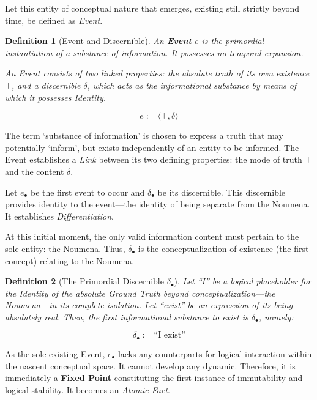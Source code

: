 \documentclass[11pt, a4paper]{article}
\theoremstyle{formalism}
\newtheorem{formalism}{Definition}
\begin{document}
Let this entity of conceptual nature that emerges, existing still strictly
beyond time, be defined as \textit{Event}.

\begin{formalism}[Event and Discernible]

    An \textbf{Event} $e$ is the primordial instantiation of a substance of
    information. It possesses no temporal expansion. 

    An Event consists of two linked properties: the absolute truth of its own
    existence $\top$, and a \textit{discernible} $\delta$, which acts as the
    informational substance by means of which it possesses \textit{Identity}.

    \begin{equation}
        e := \langle \top, \delta \rangle
    \end{equation}

\end{formalism}

The term `substance of information' is chosen to express a truth that may
potentially `inform', but exists independently of an entity to be informed.
The Event establishes a \textit{Link} between its two defining properties:
the mode of truth $\top$ and the content $\delta$.

Let $e_\bullet$ be the first event to occur and $\delta_\bullet$ be its
discernible. This discernible provides identity to the event---the identity
of being separate from the Noumena. It establishes \textit{Differentiation}.

At this initial moment, the only valid information content must pertain to the
sole entity: the Noumena. Thus, $\delta_\bullet$ is the conceptualization of
existence (the first concept) relating to the Noumena. 

\begin{formalism}[The Primordial Discernible $\delta_\bullet$]
    Let ``I'' be a logical placeholder for the Identity of the absolute Ground
    Truth beyond conceptualization---the Noumena---in its complete isolation. Let 
    ``exist'' be an expression of its being absolutely real. Then, the first
    informational substance to exist is $\delta_\bullet$, namely:

    \begin{equation}
         \delta_\bullet := \text{``I exist''}
    \end{equation}
\end{formalism}

As the sole existing Event, $e_\bullet$ lacks any counterparts for logical
interaction within the nascent conceptual space. It cannot develop any dynamic.
Therefore, it is immediately a \textbf{Fixed Point} constituting the first
instance of immutability and logical stability. It becomes an \textit{Atomic
Fact}.
\end{document}
